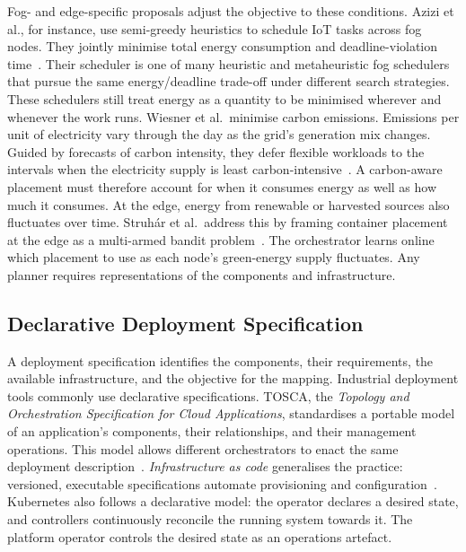Fog- and edge-specific proposals adjust the objective to these conditions.
%
Azizi et al., for instance, use semi-greedy heuristics to schedule \ac{IoT} tasks across fog nodes.
They jointly minimise total energy consumption and deadline-violation time~\cite{DBLP:journals/jnca/AziziSAB22}.
%
Their scheduler is one of many heuristic and metaheuristic fog schedulers that pursue the same energy/deadline trade-off under different search strategies.
%
These schedulers still treat energy as a quantity to be minimised wherever and whenever the work runs.
%
Wiesner et al.\ minimise carbon emissions.
%
Emissions per unit of electricity vary through the day as the grid's generation mix changes.
Guided by forecasts of carbon intensity,
they defer flexible workloads to the intervals when the electricity supply is least carbon-intensive~\cite{DBLP:conf/middleware/WiesnerBSGT21}.
%
A carbon-aware placement must therefore account for when it consumes energy as well as how much it consumes.
%
At the edge, energy from renewable or harvested sources also fluctuates over time.
%
Struhár et al.\ address this by framing container placement at the edge as a multi-armed bandit problem~\cite{DBLP:conf/ucami/StruharPAAF25}.
%
The orchestrator learns online which placement to use as each node's green-energy supply fluctuates.
%
Any planner requires representations of the components and infrastructure.

\subsection{Declarative Deployment Specification}
\label{subsec:declarative-deployment}

A deployment specification identifies the components, their requirements, the available infrastructure, and the objective for the mapping.
%
Industrial deployment tools commonly use declarative specifications.
%
TOSCA, the \emph{Topology and Orchestration Specification for Cloud Applications}, standardises a portable model of an application's components, their relationships, and their management operations.
This model allows different orchestrators to enact the same deployment description~\cite{DBLP:books/sp/aws14/BinzBKL14}.
%
\emph{Infrastructure as code} generalises the practice: versioned, executable specifications automate provisioning and configuration~\cite{DBLP:journals/infsof/RahmanMW19}.
%
Kubernetes also follows a declarative model: the operator declares a desired state, and controllers continuously reconcile the running system towards it.
%
The platform operator controls the desired state as an operations artefact.

